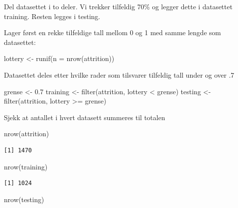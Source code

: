 \documentclass[
  letterpaper,
  DIV=11,
  numbers=noendperiod]{scrreprt}
\newenvironment{Shaded}{\begin{snugshade}}{\end{snugshade}}
\newcommand{\AttributeTok}[1]{\textcolor[rgb]{0.40,0.45,0.13}{#1}}
\newcommand{\FloatTok}[1]{\textcolor[rgb]{0.68,0.00,0.00}{#1}}
\newcommand{\FunctionTok}[1]{\textcolor[rgb]{0.28,0.35,0.67}{#1}}
\newcommand{\NormalTok}[1]{\textcolor[rgb]{0.00,0.23,0.31}{#1}}
\newcommand{\OtherTok}[1]{\textcolor[rgb]{0.00,0.23,0.31}{#1}}
\newcommand{\SpecialCharTok}[1]{\textcolor[rgb]{0.37,0.37,0.37}{#1}}
\theoremstyle{definition}
\theoremstyle{remark}
\begin{document}
Del datasettet i to deler. Vi trekker tilfeldig 70\% og legger dette i
datasettet training. Resten legges i testing.

Lager først en rekke tilfeldige tall mellom 0 og 1 med samme lengde som
datasettet:

\begin{Shaded}
\begin{Highlighting}[]
\NormalTok{lottery }\OtherTok{\textless{}{-}} \FunctionTok{runif}\NormalTok{(}\AttributeTok{n =} \FunctionTok{nrow}\NormalTok{(attrition))  }
\end{Highlighting}
\end{Shaded}

Datasettet deles etter hvilke rader som tilsvarer tilfeldig tall under
og over .7

\begin{Shaded}
\begin{Highlighting}[]
\NormalTok{grense }\OtherTok{\textless{}{-}} \FloatTok{0.7} 
\NormalTok{training }\OtherTok{\textless{}{-}} \FunctionTok{filter}\NormalTok{(attrition, lottery }\SpecialCharTok{\textless{}}\NormalTok{ grense) }
\NormalTok{testing  }\OtherTok{\textless{}{-}} \FunctionTok{filter}\NormalTok{(attrition, lottery }\SpecialCharTok{\textgreater{}=}\NormalTok{ grense) }
\end{Highlighting}
\end{Shaded}

Sjekk at antallet i hvert datasett summeres til totalen

\begin{Shaded}
\begin{Highlighting}[]
\FunctionTok{nrow}\NormalTok{(attrition) }
\end{Highlighting}
\end{Shaded}

\begin{verbatim}
[1] 1470
\end{verbatim}

\begin{Shaded}
\begin{Highlighting}[]
\FunctionTok{nrow}\NormalTok{(training) }
\end{Highlighting}
\end{Shaded}

\begin{verbatim}
[1] 1024
\end{verbatim}

\begin{Shaded}
\begin{Highlighting}[]
\FunctionTok{nrow}\NormalTok{(testing) }
\end{Highlighting}
\end{Shaded}
\end{document}
